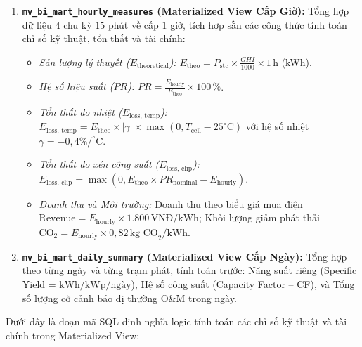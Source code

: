 \documentclass[12pt, a4paper]{report}
\begin{document}
\begin{enumerate}[label=\arabic*., leftmargin=*]
    \item \textbf{\texttt{mv\_bi\_mart\_hourly\_measures} (Materialized View Cấp Giờ):}
    Tổng hợp dữ liệu 4 chu kỳ $15$ phút về cấp $1$ giờ, tích hợp sẵn các công thức tính toán chỉ số kỹ thuật, tổn thất và tài chính:
    \begin{itemize}[noitemsep]
        \item \textit{Sản lượng lý thuyết ($E_{\text{theoretical}}$):} $E_{\text{theo}} = P_{\text{stc}} \times \frac{GHI}{1000} \times 1\,\text{h}$ (kWh).
        \item \textit{Hệ số hiệu suất ($PR$):} $PR = \frac{E_{\text{hourly}}}{E_{\text{theo}}} \times 100\,\%$.
        \item \textit{Tổn thất do nhiệt ($E_{\text{loss, temp}}$):} $E_{\text{loss, temp}} = E_{\text{theo}} \times |\gamma| \times \max(0, T_{\text{cell}} - 25^\circ\text{C})$ với hệ số nhiệt $\gamma = -0{,}4\%/^\circ\text{C}$.
        \item \textit{Tổn thất do xén công suất ($E_{\text{loss, clip}}$):} $E_{\text{loss, clip}} = \max(0, E_{\text{theo}} \times PR_{\text{nominal}} - E_{\text{hourly}})$.
        \item \textit{Doanh thu và Môi trường:} Doanh thu theo biểu giá mua điện $\text{Revenue} = E_{\text{hourly}} \times 1.800\,\text{VNĐ/kWh}$; Khối lượng giảm phát thải $\text{CO}_2 = E_{\text{hourly}} \times 0{,}82\,\text{kg CO}_2/\text{kWh}$.
    \end{itemize}

    \item \textbf{\texttt{mv\_bi\_mart\_daily\_summary} (Materialized View Cấp Ngày):}
    Tổng hợp theo từng ngày và từng trạm phát, tính toán trước: Năng suất riêng (Specific Yield = $\text{kWh/kWp/ngày}$), Hệ số công suất (Capacity Factor -- CF), và Tổng số lượng cờ cảnh báo dị thường O\&M trong ngày.
\end{enumerate}

Dưới đây là đoạn mã SQL định nghĩa logic tính toán các chỉ số kỹ thuật và tài chính trong Materialized View:
\end{document}
